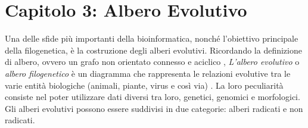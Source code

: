 \chapter{Capitolo 3: Albero Evolutivo}
Una delle sfide più importanti della bioinformatica, nonché l'obiettivo principale della filogenetica, è la costruzione degli alberi evolutivi.
\newline
Ricordando la definizione di albero, ovvero un grafo non orientato connesso e aciclico \cite{algoritmiEStruttureDati2}, \textit{L'albero evolutivo} o \textit{albero filogenetico} è un diagramma che rappresenta le relazioni evolutive tra le varie entità biologiche (animali, piante, virus e così via) \cite{buildingaphylogenictree}. La loro peculiarità consiste nel poter utilizzare dati diversi tra loro,  genetici, genomici e morfologici.
\newline
Gli alberi evolutivi possono essere suddivisi in due categorie: alberi radicati e non radicati.


